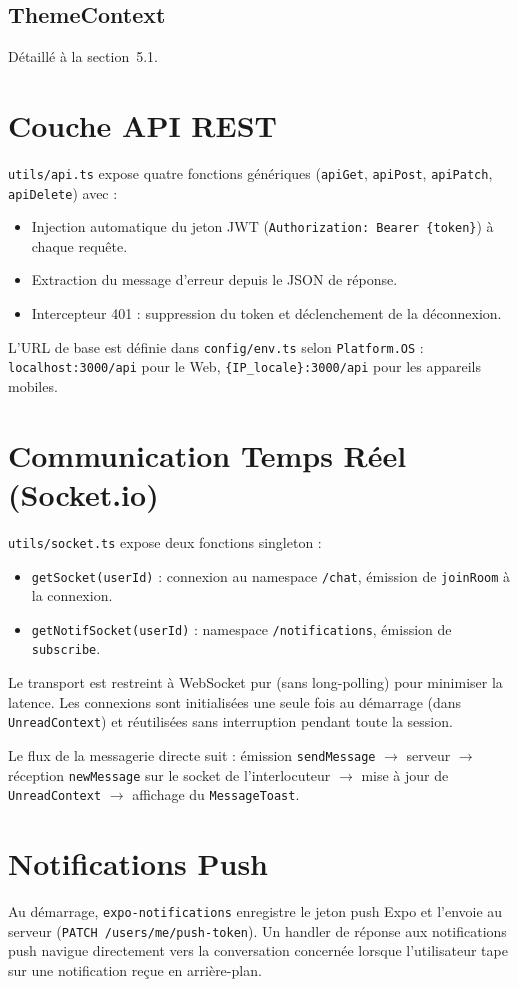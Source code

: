 \subsection{ThemeContext}
Détaillé à la section~5.1.

\section{Couche API REST}

\texttt{utils/api.ts} expose quatre fonctions génériques (\texttt{apiGet}, \texttt{apiPost}, \texttt{apiPatch}, \texttt{apiDelete}) avec :
\begin{itemize}
  \item Injection automatique du jeton JWT (\texttt{Authorization: Bearer \{token\}}) à chaque requête.
  \item Extraction du message d'erreur depuis le JSON de réponse.
  \item Intercepteur 401 : suppression du token et déclenchement de la déconnexion.
\end{itemize}

L'URL de base est définie dans \texttt{config/env.ts} selon \texttt{Platform.OS} : \texttt{localhost:3000/api} pour le Web, \texttt{\{IP\_locale\}:3000/api} pour les appareils mobiles.

\section{Communication Temps Réel (Socket.io)}

\texttt{utils/socket.ts} expose deux fonctions singleton :
\begin{itemize}
  \item \texttt{getSocket(userId)} : connexion au namespace \texttt{/chat}, émission de \texttt{joinRoom} à la connexion.
  \item \texttt{getNotifSocket(userId)} : namespace \texttt{/notifications}, émission de \texttt{subscribe}.
\end{itemize}

Le transport est restreint à WebSocket pur (sans long-polling) pour minimiser la latence. Les connexions sont initialisées une seule fois au démarrage (dans \texttt{UnreadContext}) et réutilisées sans interruption pendant toute la session.

\medskip

Le flux de la messagerie directe suit : émission \texttt{sendMessage} $\to$ serveur $\to$ réception \texttt{newMessage} sur le socket de l'interlocuteur $\to$ mise à jour de \texttt{UnreadContext} $\to$ affichage du \texttt{MessageToast}.

\section{Notifications Push}

Au démarrage, \texttt{expo-notifications} enregistre le jeton push Expo et l'envoie au serveur (\texttt{PATCH /users/me/push-token}). Un handler de réponse aux notifications push navigue directement vers la conversation concernée lorsque l'utilisateur tape sur une notification reçue en arrière-plan.
